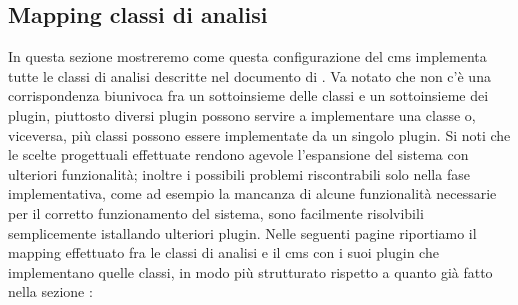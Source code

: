 \subsection{Mapping classi di analisi}
In questa sezione mostreremo come questa configurazione del \gls{cms} implementa tutte le classi di analisi descritte nel documento di . Va notato che non c'è una corrispondenza biunivoca fra un sottoinsieme delle classi e un sottoinsieme dei plugin, piuttosto diversi plugin possono servire a implementare una classe o, viceversa, più classi possono essere implementate da un singolo plugin.
Si noti che le scelte progettuali effettuate rendono agevole l'espansione del sistema con ulteriori funzionalità; inoltre i possibili problemi riscontrabili solo nella fase implementativa, come ad esempio la mancanza di alcune funzionalità necessarie per il corretto funzionamento del sistema, sono facilmente risolvibili semplicemente istallando ulteriori plugin. 
Nelle seguenti pagine riportiamo il mapping effettuato fra le classi di analisi e il \gls{cms} con i suoi plugin che implementano quelle classi, in modo più strutturato rispetto a quanto già fatto nella sezione :
